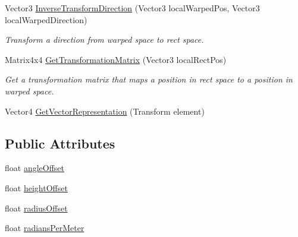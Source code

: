 \begin{DoxyCompactItemize}
Vector3 \mbox{\hyperlink{class_leap_1_1_unity_1_1_space_1_1_leap_cylindrical_space_1_1_transformer_ab494977cfba432d2af0103dbe9a004dd}{Inverse\+Transform\+Direction}} (Vector3 local\+Warped\+Pos, Vector3 local\+Warped\+Direction)
\begin{DoxyCompactList}\small\item\em Transform a direction from warped space to rect space. \end{DoxyCompactList}\item 
Matrix4x4 \mbox{\hyperlink{class_leap_1_1_unity_1_1_space_1_1_leap_cylindrical_space_1_1_transformer_a9b84b4d4ae446344b19c6c6218e1a249}{Get\+Transformation\+Matrix}} (Vector3 local\+Rect\+Pos)
\begin{DoxyCompactList}\small\item\em Get a transformation matrix that maps a position in rect space to a position in warped space. \end{DoxyCompactList}\item 
Vector4 \mbox{\hyperlink{class_leap_1_1_unity_1_1_space_1_1_leap_cylindrical_space_1_1_transformer_a7229a4bf75a299edb189790eeadd9341}{Get\+Vector\+Representation}} (Transform element)
\end{DoxyCompactItemize}
\subsection*{Public Attributes}
\begin{DoxyCompactItemize}
\item 
float \mbox{\hyperlink{class_leap_1_1_unity_1_1_space_1_1_leap_cylindrical_space_1_1_transformer_a2aaf4113a6fd898b782a533219d3d8b0}{angle\+Offset}}
\item 
float \mbox{\hyperlink{class_leap_1_1_unity_1_1_space_1_1_leap_cylindrical_space_1_1_transformer_a713b656dee217115df25fb7cbf2f5024}{height\+Offset}}
\item 
float \mbox{\hyperlink{class_leap_1_1_unity_1_1_space_1_1_leap_cylindrical_space_1_1_transformer_a378887c4ce4937377dacb6984ee30c06}{radius\+Offset}}
\item 
float \mbox{\hyperlink{class_leap_1_1_unity_1_1_space_1_1_leap_cylindrical_space_1_1_transformer_a7c876cc0b394a8bc2bc0a59a7fc5d4a1}{radians\+Per\+Meter}}
\end{DoxyCompactItemize}
